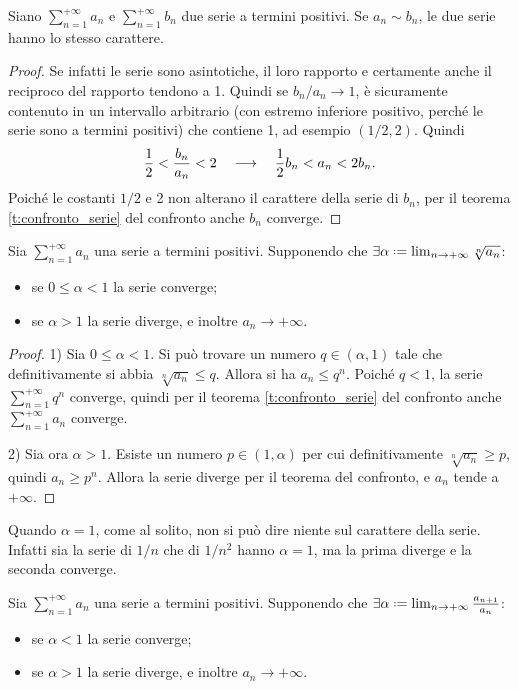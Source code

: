 \begin{corollario}
\label{c:confronto_asintotico}
Siano $\sum_{n=1}^{+\infty}a_n$ e $\sum_{n=1}^{+\infty}b_n$ due serie a termini positivi. Se $a_n\sim b_n$, le due serie hanno lo stesso carattere.
\begin{proof}
Se infatti le serie sono asintotiche, il loro rapporto e certamente anche il reciproco del rapporto tendono a 1. Quindi se $b_n/a_n\to 1$, è sicuramente contenuto in un intervallo arbitrario (con estremo inferiore positivo, perché le serie sono a termini positivi) che contiene 1, ad esempio $(1/2,2)$. Quindi
\[
\frac12<\frac{b_n}{a_n}<2\quad\longrightarrow\quad\frac12b_n<a_n<2b_n.
\]
Poiché le costanti $1/2$ e 2 non alterano il carattere della serie di $b_n$, per il teorema \ref{t:confronto_serie} del confronto anche $b_n$ converge.
\end{proof}
\end{corollario}
\begin{teorema}
\label{t:criterio_radice_serie}
Sia $\sum_{n=1}^{+\infty}a_n$ una serie a termini positivi. Supponendo che $\exists\alpha\defeq\lim_{n\to+\infty}\sqrt[n]{a_n}$:
\begin{itemize}
\item se $0\leq\alpha<1$ la serie converge;
\item se $\alpha>1$ la serie diverge, e inoltre $a_n\to+\infty$.
\end{itemize}
\end{teorema}
\begin{proof}
1) Sia $0\leq\alpha<1$. Si può trovare un numero $q\in(\alpha,1)$ tale che definitivamente si abbia $\sqrt[n]{a_n}\leq q$. Allora si ha $a_n\leq q^n$. Poiché $q<1$, la serie $\sum_{n=1}^{+\infty}q^n$ converge, quindi per il teorema \ref{t:confronto_serie} del confronto anche $\sum_{n=1}^{+\infty}a_n$ converge.

2) Sia ora $\alpha>1$. Esiste un numero $p\in(1,\alpha)$ per cui definitivamente $\sqrt[n]{a_n}\geq p$, quindi $a_n\geq p^n$. Allora la serie diverge per il teorema del confronto, e $a_n$ tende a $+\infty$.
\end{proof}
Quando $\alpha=1$, come al solito, non si può dire niente sul carattere della serie. Infatti sia la serie di $1/n$ che di $1/n^2$ hanno $\alpha=1$, ma la prima diverge e la seconda converge.
\begin{teorema}
\label{t:criterio_rapporto_serie}
Sia $\sum_{n=1}^{+\infty}a_n$ una serie a termini positivi. Supponendo che $\exists\alpha\defeq\lim_{n\to+\infty}\frac{a_{n+1}}{a_n}$:
\begin{itemize}
\item se $\alpha<1$ la serie converge;
\item se $\alpha>1$ la serie diverge, e inoltre $a_n\to+\infty$.
\end{itemize}
\end{teorema}

